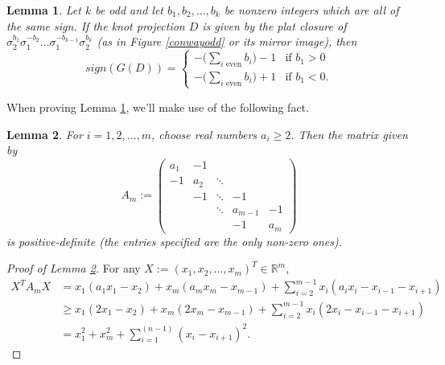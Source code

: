 \documentclass[11pt]{article}
\theoremstyle{plain} \newtheorem{thm}{Theorem}[subsection]
\theoremstyle{plain} \newtheorem{cor}[thm]{Corollary}
\theoremstyle{plain} \newtheorem{prop}[thm]{Proposition}
\theoremstyle{plain} \newtheorem{conj}[thm]{Conjecture}
\theoremstyle{plain} \newtheorem{lem}[thm]{Lemma}
\theoremstyle{definition} \newtheorem{df}[thm]{Definition}
\theoremstyle{remark} \newtheorem{rmk}[thm]{Remark}
\theoremstyle{remark} \newtheorem{obs}[thm]{Observation}
\numberwithin{equation}{section}
\begin{document}
\begin{lem}\label{goeritzlem}
Let $k$ be odd and let $b_1, b_2, \ldots, b_k$ be nonzero integers which are all of the same sign.  If the knot projection $D$ is given by the plat closure of $\sigma_{2}^{b_{1}}\sigma_{1}^{-b_{2}} \ldots \sigma_{1}^{-b_{k-1}}\sigma_{2}^{b_{k}}$ (as in Figure \ref{conwayodd} or its mirror image),  then
\begin{equation*}
sign(G(D)) = 
\begin{cases} 
-\bigg(\displaystyle\sum_{i\text{ even}} b_{i}\bigg)- 1& \text{if $b_{1} > 0$}\\
-\bigg(\displaystyle\sum_{i\text{ even}} b_{i}\bigg) + 1& \text{if $b_{1} < 0$}.
\end{cases}
\end{equation*}
\end{lem}

When proving Lemma \ref{goeritzlem}, we'll make use of the following fact.

\begin{lem}\label{PDlem}
For $i = 1, 2, \ldots, m$, choose real numbers $a_{i} \geq 2$.  Then the matrix given by
$$
A_m:= \left(\begin{array}{ccccc}
a_1 & -1 & & &\\
-1 & a_2 & \ddots & &\\
& -1 & \ddots & -1 &\\
& & \ddots & a_{m-1} & -1\\
& & & -1 &a_m
\end{array}\right)
$$
is positive-definite (the entries specified are the only non-zero ones).
\end{lem}
\begin{proof}[Proof of Lemma \ref{PDlem}]
For any $X:=\left( x_1, x_2, \ldots, x_m \right)^{T} \in \mathbb{R}^m$,
\begin{align*}
X^T A_m X &= x_1 \left( a_1 x_1 - x_2 \right) + x_m \left( a_m x_m - x_{m-1}\right) + \sum_{i = 2}^{m-1} x_i \left( a_i x_i - x_{i-1}-x_{i+1}  \right)\\
&\geq x_1 \left( 2 x_1 - x_2 \right) + x_m \left( 2 x_m - x_{m-1}\right) + \sum_{i = 2}^{m-1} x_i \left( 2 x_i - x_{i-1}-x_{i+1} \right)\\
& = x_1^2 + x_m^2 + \sum_{i = 1}^{(n-1)} \left( x_i - x_{i+1}\right)^2.
\end{align*}
\end{proof}
\end{document}
